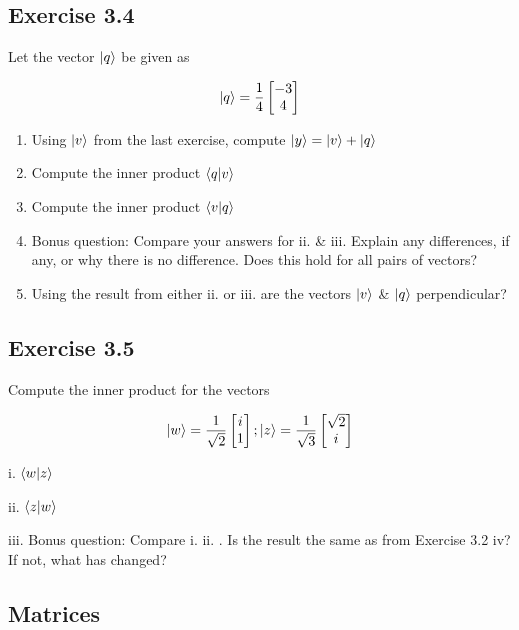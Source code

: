 \documentclass{book}
\begin{document}
\subsection{Exercise 3.4}

Let the vector $\ket{q}$ be given as 

$$ \ket{q} = \frac{1}{4} \begin{bmatrix} -3 \\ 4 \end{bmatrix} $$

\begin{enumerate}[i]
    \item Using $\ket{v}$ from the last exercise, compute  $\ket{y} = \ket{v} + \ket{q} $
    \item Compute the inner product $ \braket{q | v} $
    \item Compute the inner product $ \braket{v | q} $ 
    \item Bonus question: Compare your answers for ii. \& iii. Explain any differences, if any, or why there is no difference. Does this hold for all pairs of vectors?
    \item Using the result from either ii. or iii. are the vectors $\ket{v}$ \& $\ket{q}$ perpendicular?
    
\end{enumerate}


\subsection{Exercise 3.5}

Compute the inner product for the vectors 

$$ \ket{w} = \frac{1}{\sqrt{2}} \begin{bmatrix} i \\ 1 \end{bmatrix} ; \ket{z} = \frac{1}{\sqrt{3}} \begin{bmatrix} \sqrt{2} \\ i \end{bmatrix}$$

i. $\braket{w|z}$

ii. $\braket{z|w}$

iii. Bonus question: Compare i. ii. . Is the result the same as from Exercise 3.2 iv? 
If not, what has changed?



\subsection{ Matrices}
\end{document}

